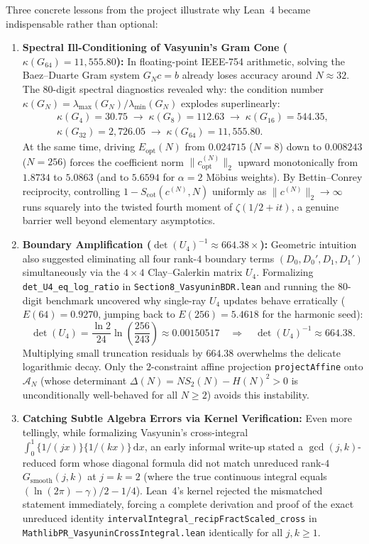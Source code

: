 \documentclass[11pt,a4paper]{article}
\newcommand{\dee}{\mathrm{d}}
\begin{document}
Three concrete lessons from the project illustrate why Lean~4 became indispensable rather than optional:
\begin{enumerate}[noitemsep]
    \item \textbf{Spectral Ill-Conditioning of Vasyunin's Gram Cone ($\kappa(G_{64}) = 11{,}555.80$):} In floating-point IEEE-754 arithmetic, solving the Baez--Duarte Gram system $G_N c = b$ already loses accuracy around $N \approx 32$. The $80$-digit spectral diagnostics revealed why: the condition number $\kappa(G_N) = \lambda_{\max}(G_N) / \lambda_{\min}(G_N)$ explodes superlinearly:
    \begin{gather*}
        \kappa(G_4) = 30.75 \;\longrightarrow\; \kappa(G_8) = 112.63 \;\longrightarrow\; \kappa(G_{16}) = 544.35, \\
        \kappa(G_{32}) = 2{,}726.05 \;\longrightarrow\; \kappa(G_{64}) = 11{,}555.80.
    \end{gather*}
    At the same time, driving $E_{\mathrm{opt}}(N)$ from $0.024715$ ($N=8$) down to $0.008243$ ($N=256$) forces the coefficient norm $\|c^{(N)}_{\mathrm{opt}}\|_2$ upward monotonically from $1.8734$ to $5.0863$ (and to $5.6594$ for $\alpha = 2$ M\"obius weights). By Bettin--Conrey reciprocity, controlling $1 - S_{\mathrm{cot}}(c^{(N)}, N)$ uniformly as $\|c^{(N)}\|_2 \to \infty$ runs squarely into the twisted fourth moment of $\zeta(1/2 + it)$, a genuine barrier well beyond elementary asymptotics.
    \item \textbf{Boundary Amplification ($\det(U_4)^{-1} \approx 664.38\times$):} Geometric intuition also suggested eliminating all four rank-$4$ boundary terms $(D_0, D_0', D_1, D_1')$ simultaneously via the $4 \times 4$ Clay--Galerkin matrix $U_4$. Formalizing \texttt{det\_U4\_eq\_log\_ratio} in \texttt{Section8\_\allowbreak VasyuninBDR.lean} and running the $80$-digit benchmark uncovered why single-ray $U_4$ updates behave erratically ($E(64) = 0.9270$, jumping back to $E(256) = 5.4618$ for the harmonic seed):
    \[
        \det(U_4) = \frac{\ln 2}{24} \ln\!\left(\frac{256}{243}\right) \approx 0.00150517 \quad \Longrightarrow \quad \det(U_4)^{-1} \approx 664.38.
    \]
    Multiplying small truncation residuals by $664.38$ overwhelms the delicate logarithmic decay. Only the $2$-constraint affine projection \texttt{projectAffine} onto $\mathcal{A}_N$ (whose determinant $\Delta(N) = N S_2(N) - H(N)^2 > 0$ is unconditionally well-behaved for all $N \ge 2$) avoids this instability.
    \item \textbf{Catching Subtle Algebra Errors via Kernel Verification:} Even more tellingly, while formalizing Vasyunin's cross-integral $\int_0^1 \{1/(jx)\}\{1/(kx)\}\,\dee x$, an early informal write-up stated a $\gcd(j, k)$-reduced form whose diagonal formula did not match unreduced rank-$4$ $G_{\mathrm{smooth}}(j, k)$ at $j = k = 2$ (where the true continuous integral equals $(\ln(2\pi) - \gamma)/2 - 1/4$). Lean~4's kernel rejected the mismatched statement immediately, forcing a complete derivation and proof of the exact unreduced identity \texttt{intervalIntegral\_\allowbreak recipFractScaled\_cross} in \texttt{MathlibPR\_\allowbreak VasyuninCrossIntegral.lean} identically for all $j, k \ge 1$.
\end{enumerate}
\end{document}
